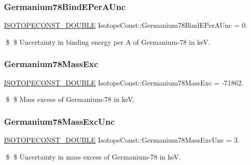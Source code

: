 \subsubsection{\texorpdfstring{Germanium78\+Bind\+E\+Per\+A\+Unc}{Germanium78BindEPerAUnc}}
{\footnotesize\ttfamily \mbox{\hyperlink{group___isotope_const-_macros_ga8f45a7272ce02c0b4c65c44636ed719a}{I\+S\+O\+T\+O\+P\+E\+C\+O\+N\+S\+T\+\_\+\+D\+O\+U\+B\+LE}} Isotope\+Const\+::\+Germanium78\+Bind\+E\+Per\+A\+Unc = 0.}

\$ \$ Uncertainty in binding energy per A of Germanium-\/78 in keV. \mbox{\label{group___isotope_const-_germanium-_ge78_ga6565e5bf5600f27e5af458724cced692}} 
\subsubsection{\texorpdfstring{Germanium78\+Mass\+Exc}{Germanium78MassExc}}
{\footnotesize\ttfamily \mbox{\hyperlink{group___isotope_const-_macros_ga8f45a7272ce02c0b4c65c44636ed719a}{I\+S\+O\+T\+O\+P\+E\+C\+O\+N\+S\+T\+\_\+\+D\+O\+U\+B\+LE}} Isotope\+Const\+::\+Germanium78\+Mass\+Exc = -\/71862.}

\$ \$ Mass excess of Germanium-\/78 in keV. \mbox{\label{group___isotope_const-_germanium-_ge78_gaf04d5ab53fa808f0d0287adcbc688582}} 
\subsubsection{\texorpdfstring{Germanium78\+Mass\+Exc\+Unc}{Germanium78MassExcUnc}}
{\footnotesize\ttfamily \mbox{\hyperlink{group___isotope_const-_macros_ga8f45a7272ce02c0b4c65c44636ed719a}{I\+S\+O\+T\+O\+P\+E\+C\+O\+N\+S\+T\+\_\+\+D\+O\+U\+B\+LE}} Isotope\+Const\+::\+Germanium78\+Mass\+Exc\+Unc = 3.}

\$ \$ Uncertainty in mass excess of Germanium-\/78 in keV. \mbox{\label{group___isotope_const-_germanium-_ge78_gaa4d2f73d1e91c5aa7791abaa4ba997f5}} 
